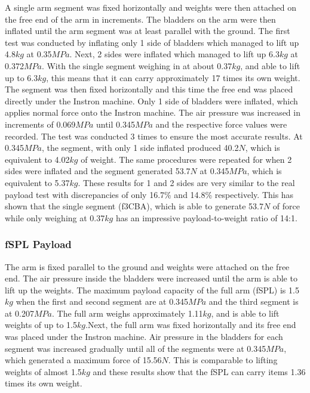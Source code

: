 \documentclass[letterpaper, 10 pt, conference]{ieeeconf}  %
\begin{document}
A single arm segment was fixed horizontally and weights were then attached on the free end of the arm in increments. The bladders on the arm were then inflated until the arm segment was at least parallel with the ground. The first test was conducted by inflating only 1 side of bladders which managed to lift up 4.8$kg$ at 0.35$MPa$. Next, 2 sides were inflated which managed to lift up 6.3$kg$ at 0.372$MPa$. With the single segment weighing in at about 0.37$kg$, and able to lift up to 6.3$kg$, this means that it can carry approximately 17 times its own weight. The segment was then fixed horizontally and this time the free end was placed directly under the Instron machine. Only 1 side of bladders were inflated, which applies normal force onto the Instron machine. The air pressure was increased in increments of 0.069$MPa$ until 0.345$MPa$ and the respective force values were recorded. The test was conducted 3 times to ensure the most accurate results. At 0.345$MPa$, the segment, with only 1 side inflated produced 40.2$N$, which is equivalent to 4.02$kg$ of weight. The same procedures were repeated for when 2 sides were inflated and the segment generated 53.7$N$ at 0.345$MPa$, which is equivalent to 5.37$kg$. These results for 1 and 2 sides are very similar to the real payload test with discrepancies of only 16.7\% and 14.8\% respectively. This has shown that the single segment (f3CBA), which is able to generate 53.7$N$ of force while only weighing at 0.37$kg$ has an impressive payload-to-weight ratio of 14:1.

\subsubsection{fSPL Payload}
The arm is fixed parallel to the ground and weights were attached on the free end. The air pressure inside the bladders were increased until the arm is able to lift up the weights. The maximum payload capacity of the full arm (fSPL) is 1.5$kg$ when the first and second segment are at 0.345$MPa$ and the third segment is at 0.207$MPa$. The full arm weighs approximately 1.11$kg$, and is able to lift weights of up to 1.5$kg$.Next, the full arm was fixed horizontally and its free end was placed under the Instron machine. Air pressure in the bladders for each segment was increased gradually until all of the segments were at 0.345$MPa$, which generated a maximum force of 15.56$N$. This is comparable to lifting weights of almost 1.5$kg$ and these results show that the fSPL can carry items 1.36 times its own weight.
\end{document}
